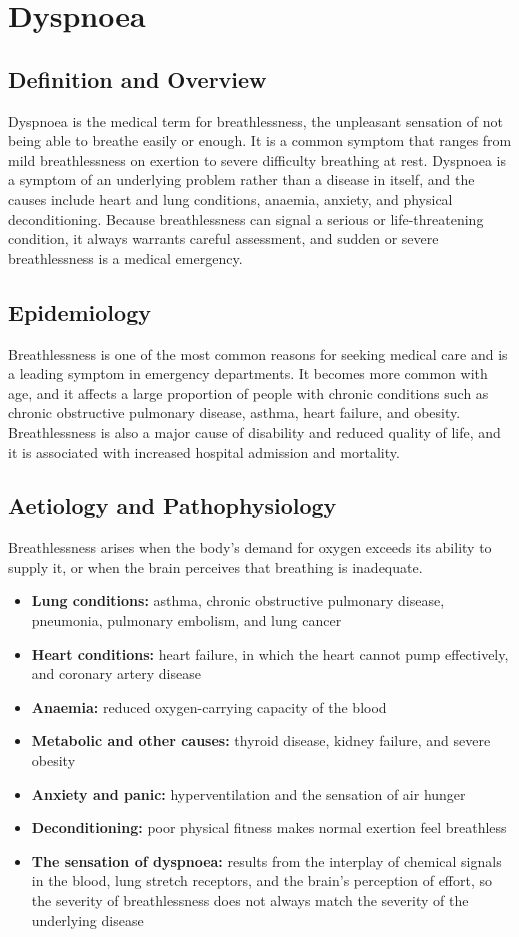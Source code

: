 \chapter{Dyspnoea}

\section*{Definition and Overview}
Dyspnoea is the medical term for breathlessness, the unpleasant sensation of not being able to breathe easily or enough. It is a common symptom that ranges from mild breathlessness on exertion to severe difficulty breathing at rest. Dyspnoea is a symptom of an underlying problem rather than a disease in itself, and the causes include heart and lung conditions, anaemia, anxiety, and physical deconditioning. Because breathlessness can signal a serious or life-threatening condition, it always warrants careful assessment, and sudden or severe breathlessness is a medical emergency.

\section*{Epidemiology}
Breathlessness is one of the most common reasons for seeking medical care and is a leading symptom in emergency departments. It becomes more common with age, and it affects a large proportion of people with chronic conditions such as chronic obstructive pulmonary disease, asthma, heart failure, and obesity. Breathlessness is also a major cause of disability and reduced quality of life, and it is associated with increased hospital admission and mortality.

\section*{Aetiology and Pathophysiology}
Breathlessness arises when the body's demand for oxygen exceeds its ability to supply it, or when the brain perceives that breathing is inadequate.
\begin{itemize}
    \item \textbf{Lung conditions:} asthma, chronic obstructive pulmonary disease, pneumonia, pulmonary embolism, and lung cancer
    \item \textbf{Heart conditions:} heart failure, in which the heart cannot pump effectively, and coronary artery disease
    \item \textbf{Anaemia:} reduced oxygen-carrying capacity of the blood
    \item \textbf{Metabolic and other causes:} thyroid disease, kidney failure, and severe obesity
    \item \textbf{Anxiety and panic:} hyperventilation and the sensation of air hunger
    \item \textbf{Deconditioning:} poor physical fitness makes normal exertion feel breathless
    \item \textbf{The sensation of dyspnoea:} results from the interplay of chemical signals in the blood, lung stretch receptors, and the brain's perception of effort, so the severity of breathlessness does not always match the severity of the underlying disease
\end{itemize}

